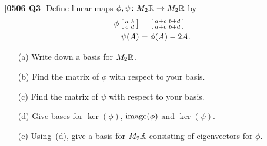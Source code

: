 \documentclass[a4paper]{article}
\begin{document}
\begin{problem}\textbf{[0506 Q3]}
 Define linear maps $\phi,\psi\colon M_2{\mathbb{R}}\to M_2{\mathbb{R}}$ by
 \begin{align*}
  \phi\left[\begin{smallmatrix} a & b \\ c & d \end{smallmatrix}\right] &=
    \left[\begin{smallmatrix} a+c & b+d \\ a+c & b+d \end{smallmatrix}\right] \\
  \psi(A) &= \phi(A)-2A.
 \end{align*}
 \begin{itemize}
  \item[(a)] Write down a basis for $M_2{\mathbb{R}}$. 
  \item[(b)] Find the matrix of $\phi$ with respect to your
   basis.  
  \item[(c)] Find the matrix of $\psi$ with respect to your
   basis. 
  \item[(d)] Give bases for $\ker(\phi)$, $\operatorname{image}(\phi)$ and
   $\ker(\psi)$.    
  \item[(e)] Using~(d), give a basis for $M_2{\mathbb{R}}$ consisting
   of eigenvectors for $\phi$. 
 \end{itemize}
\end{problem}
\end{document}
